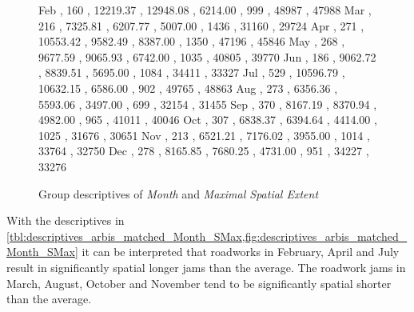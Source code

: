 \begin{figure}[ht!]
\begin{minipage}{0.55\textwidth}
{			Feb , 160 , 12219.37 , 12948.08 , 6214.00 , 999  , 48987 , 47988
			Mar , 216 , 7325.81  , 6207.77  , 5007.00 , 1436 , 31160 , 29724
			Apr , 271 , 10553.42 , 9582.49  , 8387.00 , 1350 , 47196 , 45846
			May , 268 , 9677.59  , 9065.93  , 6742.00 , 1035 , 40805 , 39770
			Jun , 186 , 9062.72  , 8839.51  , 5695.00 , 1084 , 34411 , 33327
			Jul , 529 , 10596.79 , 10632.15 , 6586.00 , 902  , 49765 , 48863
			Aug , 273 , 6356.36  , 5593.06  , 3497.00 , 699  , 32154 , 31455
			Sep , 370 , 8167.19  , 8370.94  , 4982.00 , 965  , 41011 , 40046
			Oct , 307 , 6838.37  , 6394.64  , 4414.00 , 1025 , 31676 , 30651 
			Nov , 213 , 6521.21  , 7176.02  , 3955.00 , 1014 , 33764 , 32750
			Dec , 278 , 8165.85  , 7680.25  , 4731.00 , 951  , 34227 , 33276
		}\data
		\pgfplotstablesort[sort key=mean, sort cmp=float >]{\datasorted}{\data}
		\tiny
		\centering
		\label{fig:descriptives_arbis_matched_Month_SMax}
	\end{minipage}%
	\caption{Group descriptives of \textit{Month} and \textit{Maximal Spatial Extent}}
\end{figure}
With the descriptives in \cref{tbl:descriptives_arbis_matched_Month_SMax,fig:descriptives_arbis_matched_Month_SMax} it can be interpreted that roadworks in February, April and July result in significantly spatial longer jams than the average. The roadwork jams in March, August, October and November tend to be significantly spatial shorter than the average.
